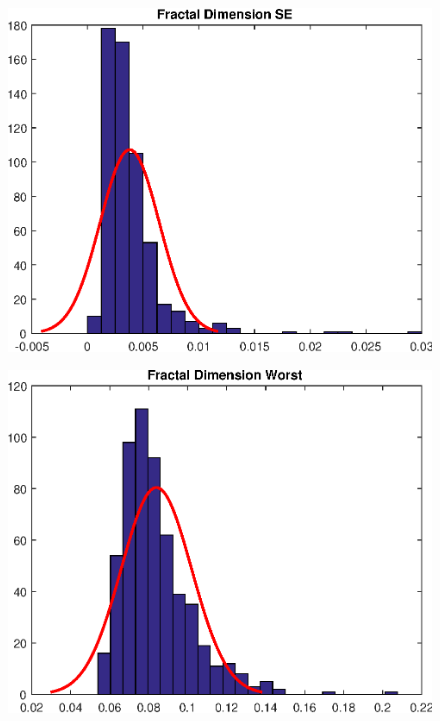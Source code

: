 \documentclass[11pt,a4paper]{article}
\numberwithin{equation}{section}
\begin{document}
\begin{itemize}
\begin{figure}[H]
\centering
\begin{minipage}{.4\textwidth}
  \centering
  \includegraphics[width=\linewidth]{./img/fractal_dimension_se}
  \label{fig:test1}
\end{minipage}%
\begin{minipage}{.4\textwidth}
  \centering
  \includegraphics[width=\linewidth]{./img/fractal_dimension_worst}
  \label{fig:test2}
\end{minipage}
\end{figure}
\end{itemize}
\end{document}
